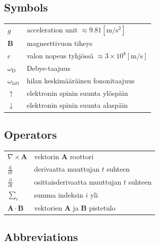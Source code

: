 \documentclass[english,12pt,a4paper,pdftex,elec,utf8]{aaltothesis}
\begin{document}
\thesistableofcontents




\subsection*{Symbols}

\begin{tabular}{ll}
$g$          & acceleration unit $ \approx 9.81 \mathrm{[m/s^2]}$\\
$\mathbf{B}$  & magneettivuon tiheys  \\
$c$              & valon nopeus tyhjössä $\approx 3\times10^8 \mathrm{ [m/s]}$\\
$\omega_{\mathrm{D}}$    & Debye-taajuus \\
$\omega_{\mathrm{latt}}$ & hilan keskimääräinen fononitaajuus \\
$\uparrow$       & elektronin spinin suunta ylöspäin\\
$\downarrow$     & elektronin spinin suunta alaspäin
\end{tabular}

\subsection*{Operators}

\begin{tabular}{ll}
$\nabla \times \mathbf{A}$              & vektorin $\mathbf{A}$ roottori\\
$\displaystyle\frac{\mbox{d}}{\mbox{d} t}$ & derivaatta muuttujan $t$ suhteen\\
[3mm]
$\displaystyle\frac{\partial}{\partial t}$  & osittaisderivaatta muuttujan $t$ suhteen \\[3mm]
$\sum_i $                       & summa indeksin $i$ yli\\
$\mathbf{A} \cdot \mathbf{B}$    & vektorien $\mathbf{A}$ ja $\mathbf{B}$ pistetulo
\end{tabular}

\subsection*{Abbreviations}
\end{document}
